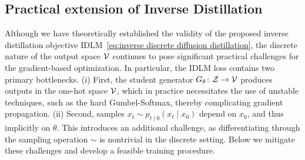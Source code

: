 \vspace{-2mm}
\subsection{Practical extension of Inverse Distillation}
\label{sec:practical extension of idlm}
\vspace{-2mm}
Although we have theoretically established the validity of the proposed inverse distillation objective IDLM~\eqref{eq:inverse discrete diffusion distillation}, the discrete nature of the output space $\mathcal{V}$ continues to pose significant practical challenges for the gradient-based optimization. 
In particular, the IDLM loss contains two primary bottlenecks. (i) First, the student generator ${G_{\theta} \colon \mathcal{Z} \to \mathcal{V}}$ produces outputs in the one-hot space $\mathcal{V}$, which in practice necessitates the use of unstable techniques, such as the hard Gumbel-Softmax, thereby complicating gradient propagation. (ii) Second, samples $x_t \sim p_{t \mid 0}(x_t \mid x_0)$ depend on $x_0$, and thus implicitly on $\theta$. This introduces an additional challenge, as differentiating through the sampling operation $\sim$ is nontrivial in the discrete setting. Below we mitigate these challenges and develop a feasible training procedure.

